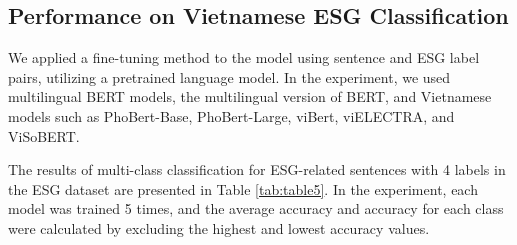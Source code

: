 \documentclass[12pt, letterpaper]{template}
\begin{document}
{{{%


\subsection{Performance on Vietnamese ESG Classification}

We applied a fine-tuning method to the model using sentence and ESG label pairs, utilizing a pretrained language model. In the experiment, we used multilingual BERT models, the multilingual version of BERT, and Vietnamese models such as PhoBert-Base, PhoBert-Large, viBert, viELECTRA, and ViSoBERT.

\hspace{2em}The results of multi-class classification for ESG-related sentences with 4 labels in the ESG dataset are presented in Table \ref{tab:table5}. In the experiment, each model was trained 5 times, and the average accuracy and accuracy for each class were calculated by excluding the highest and lowest accuracy values.

}}}
\end{document}
